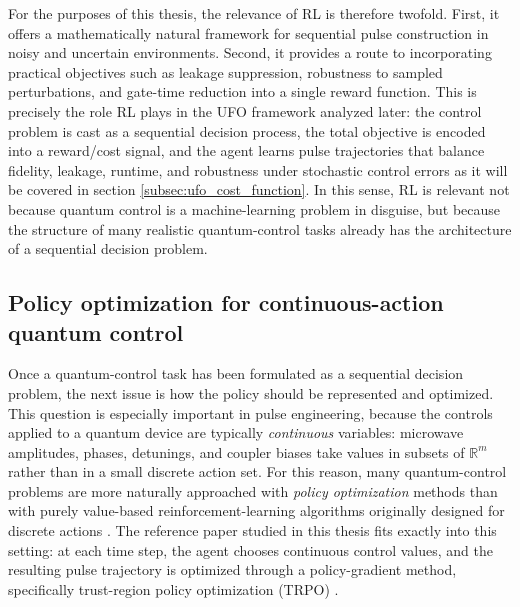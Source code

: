 For the purposes of this thesis, the relevance of RL is therefore twofold. First, it offers a mathematically natural framework for sequential pulse construction in noisy and uncertain environments. Second, it provides a route to incorporating practical objectives such as leakage suppression, robustness to sampled perturbations, and gate-time reduction into a single reward function. This is precisely the role RL plays in the UFO framework analyzed later: the control problem is cast as a sequential decision process, the total objective is encoded into a reward/cost signal, and the agent learns pulse trajectories that balance fidelity, leakage, runtime, and robustness under stochastic control errors as it will be covered in section \ref{subsec:ufo_cost_function}. In this sense, RL is relevant not because quantum control is a machine-learning problem in disguise, but because the structure of many realistic quantum-control tasks already has the architecture of a sequential decision problem.


\subsection{Policy optimization for continuous-action quantum control}
\label{subsec:policy_optimization_continuous_actions}

Once a quantum-control task has been formulated as a sequential decision problem, the next issue is how the policy should be represented and optimized. This question is especially important in pulse engineering, because the controls applied to a quantum device are typically \emph{continuous} variables: microwave amplitudes, phases, detunings, and coupler biases take values in subsets of $\mathbb{R}^{m}$ rather than in a small discrete action set. For this reason, many quantum-control problems are more naturally approached with \emph{policy optimization} methods than with purely value-based reinforcement-learning algorithms originally designed for discrete actions \cite{SuttonBarto2018,Silver2014,Giannelli2022}. The reference paper studied in this thesis fits exactly into this setting: at each time step, the agent chooses continuous control values, and the resulting pulse trajectory is optimized through a policy-gradient method, specifically trust-region policy optimization (TRPO) \cite{Niu2019}.

